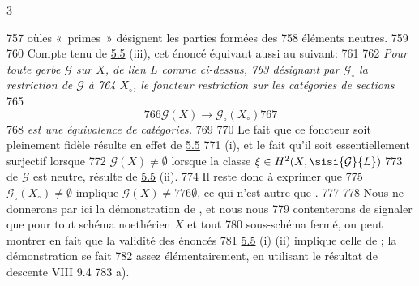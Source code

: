 3	\documentclass[10pt]{../fichiers-configuration-latex/smfart}
\begin{document}
   757	où\pageoriginale les « primes »  désignent les parties formées des
   758	éléments neutres.
   759	
   760	Compte tenu de \hyperref[XII.cor5.5]{5.5} (iii), cet énoncé équivaut aussi au suivant:
   761	
   762	\emph{Pour toute gerbe $\mathcal{G}$ sur $X$, de lien $L$ comme ci-dessus,
   763	  désignant par $\mathcal{G}_{\circ}$ la restriction de $\mathcal{G}$ à
   764	  $X_{\circ}$, le foncteur restriction sur les catégories de sections}
   765	$$
   766	\mathcal{G}(X)\longrightarrow \mathcal{G}_{\circ}(X_{\circ})
   767	$$
   768	\emph{est une équivalence de catégories.}
   769	
   770	Le fait que ce foncteur soit pleinement fidèle résulte en effet de \hyperref[XII.cor5.5]{5.5}
   771	(i), et le fait qu'il soit essentiellement surjectif lorsque
   772	$\mathcal{G}(X)\neq ∅$ \ie lorsque la classe $\xi \in H^2(X,\sisi{\mathcal{G}}{L})$
   773	de $\mathcal{G}$ est neutre, résulte de \hyperref[XII.cor5.5]{5.5} (ii). 
   774	Il reste donc à exprimer que 
   775	$\mathcal{G}_{\circ}(X_{\circ})\neq ∅$ implique $\mathcal{G}(X)\neq
   776	∅$, ce  qui n'est autre que .
   777	
   778	Nous ne donnerons par ici la démonstration de , et nous nous
   779	contenterons de signaler que pour tout schéma noethérien $X$ et tout
   780	sous-schéma fermé, on peut montrer en fait que la validité des énoncés
   781	\hyperref[XII.cor5.5]{5.5} (i) (ii) implique celle de ; la démonstration se fait
   782	assez élémentairement, en utilisant le résultat de descente VIII 9.4
   783	a).
\end{document}
